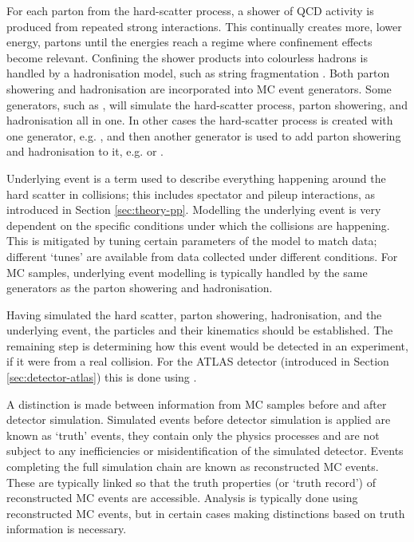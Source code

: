 For each parton from the hard-scatter process, a shower of \ac{QCD} activity is
produced from repeated strong interactions. This continually creates more, lower
energy, partons until the energies reach a regime where confinement effects
become relevant. Confining the shower products into colourless hadrons is
handled by a hadronisation model, such as string fragmentation
\cite{Andersson1983}. Both parton showering and hadronisation are incorporated
into \ac{MC} event generators. Some generators, such as \sherpa, will simulate
the hard-scatter process, parton showering, and hadronisation all in one. In
other cases the hard-scatter process is created with one generator, e.g.
\madgraph, and then another generator is used to add parton showering and
hadronisation to it, e.g. \pythia or \herwig.

Underlying event is a term used to describe everything happening around the hard
scatter in collisions; this includes spectator and pileup interactions, as
introduced in Section \ref{sec:theory-pp}.
Modelling the underlying event is very dependent on the specific conditions
under which the collisions are happening.  This is mitigated by tuning certain
parameters of the model to match data; different `tunes' are available from data
collected under different conditions.  For \ac{MC} samples, underlying event
modelling is typically handled by the same generators as the parton showering
and hadronisation.

Having simulated the hard scatter, parton showering, hadronisation, and the
underlying event, the particles and their kinematics should be established. The
remaining step is determining how this event would be detected in an experiment,
if it were from a real collision. For the \acs{ATLAS} detector (introduced in
Section \ref{sec:detector-atlas}) this is done using \geantfour \cite{geant4,
ATLASsim1}.

A distinction is made between information from \ac{MC} samples before and after
detector simulation. Simulated events before detector simulation is applied are
known as `truth' events, they contain only the physics processes and are not
subject to any inefficiencies or misidentification of the simulated detector.
Events completing the full simulation chain are known as reconstructed \ac{MC}
events. These are typically linked so that the truth properties (or `truth
record') of reconstructed \ac{MC} events are accessible. Analysis is typically
done using reconstructed \ac{MC} events, but in certain cases making
distinctions based on truth information is necessary.


